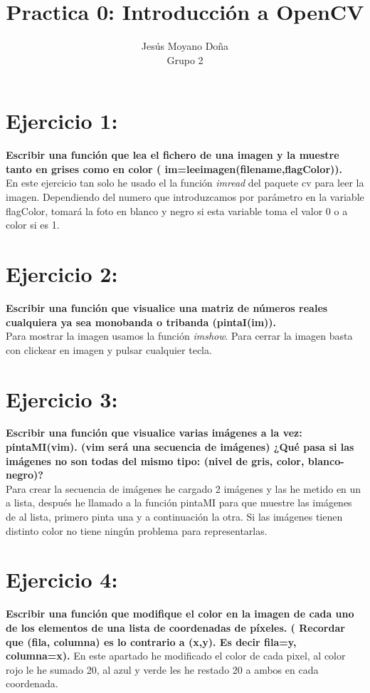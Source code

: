 \documentclass[11pt]{article}
\title{Practica 0: Introducción a OpenCV \\}
\author{Jesús Moyano Doña\\
  \small Grupo 2 \\ 
}
\theoremstyle{definition}
\theoremstyle{remark}
\begin{document}
\maketitle

\section*{Ejercicio 1:}
\noindent
\textbf{Escribir una función que lea el fichero de una imagen y la muestre tanto en grises como en color ( im=leeimagen(filename,flagColor)).}  
\\
En este ejercicio tan solo he usado el la función \textit{imread} del paquete cv para leer la imagen. Dependiendo del numero que introduzcamos por parámetro en la variable flagColor, tomará la foto en blanco y negro si esta variable toma el valor 0 o a color si es 1.
 
\section*{Ejercicio 2:}
\noindent
\textbf{Escribir una función que visualice una matriz de números reales cualquiera ya sea monobanda o tribanda (pintaI(im)).}  
\\
Para mostrar la imagen usamos la función \textit{imshow}. Para cerrar la imagen basta con clickear en imagen y pulsar cualquier tecla.

\section*{Ejercicio 3:}
\noindent
\textbf{Escribir una función que visualice varias imágenes a la vez: pintaMI(vim). (vim será una secuencia de imágenes) ¿Qué pasa si las imágenes no son todas del mismo tipo: (nivel de gris, color, blanco-negro)?}  
\\
Para crear la secuencia de imágenes he cargado 2 imágenes y las he metido en un a lista, después he llamado a la función pintaMI para que muestre las imágenes de al lista, primero pinta una y a continuación la otra. Si las imágenes tienen distinto color no tiene ningún problema para representarlas.

\section*{Ejercicio 4:}
\noindent
\textbf{Escribir una función que modifique el color en la imagen de cada uno de los elementos de una lista de coordenadas de píxeles. ( Recordar que (fila, columna) es lo contrario a (x,y). Es decir fila=y, columna=x).}  
En este apartado he modificado el color de cada pixel, al color rojo le he sumado 20, al azul y verde les he restado 20 a ambos en cada coordenada.
\end{document}
